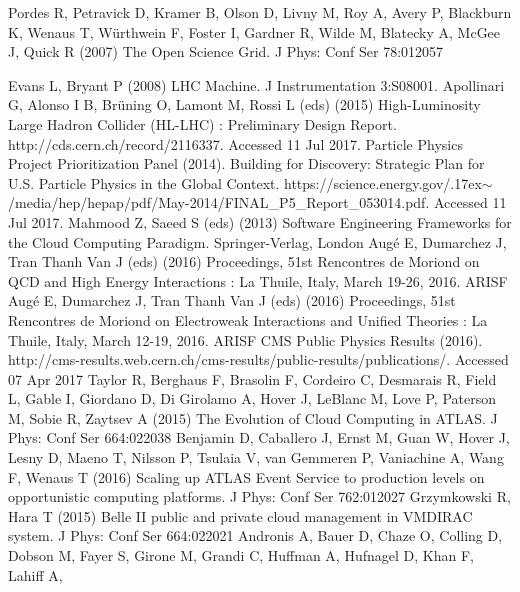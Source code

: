 \documentclass[twocolumn]{svjour3}          %
\begin{document}
\begin{thebibliography}{15}
 Pordes R, Petravick D, Kramer B, Olson D, Livny M, Roy A, Avery P, Blackburn K, Wenaus T,
W\"urthwein F, Foster I, Gardner R, Wilde M, Blatecky A, McGee J, Quick R (2007) The Open Science Grid. J Phys: Conf Ser 78:012057

 Evans L, Bryant P (2008) LHC Machine. J Instrumentation 3:S08001.
 Apollinari G, Alonso I B, Br\"uning O, Lamont M, Rossi L (eds) (2015) High-Luminosity Large Hadron Collider (HL-LHC) : Preliminary Design Report. http://cds.cern.ch/record/2116337. Accessed 11 Jul 2017.
 Particle Physics Project Prioritization Panel (2014). Building for Discovery: Strategic Plan for U.S. Particle Physics in the Global Context. https://science.energy.gov/{\raise.17ex\hbox{$\scriptstyle\sim$}}/media/hep/hepap/pdf/May-2014/FINAL\_P5\_Report\_053014.pdf. Accessed 11 Jul 2017.
 Mahmood Z, Saeed S (eds) (2013) Software Engineering Frameworks for the Cloud Computing Paradigm. Springer-Verlag, London
 Aug\'e E, Dumarchez J, Tran Thanh Van J (eds) (2016) Proceedings, 51st Rencontres de Moriond on QCD and High Energy Interactions : La Thuile, Italy, March 19-26, 2016. ARISF %
 Aug\'e E, Dumarchez J, Tran Thanh Van J (eds) (2016) Proceedings, 51st Rencontres de Moriond on Electroweak Interactions and Unified Theories : La Thuile, Italy, March 12-19, 2016. ARISF  %
 CMS Public Physics Results (2016). http://cms-results.web.cern.ch/cms-results/public-results/publications/. Accessed 07 Apr 2017
 Taylor R, Berghaus F, Brasolin F, Cordeiro C, Desmarais R, Field L, Gable I,  Giordano D, Di Girolamo A, Hover J, LeBlanc M, Love P, Paterson M, Sobie R, Zaytsev A (2015) The Evolution of Cloud Computing in ATLAS.  J Phys: Conf Ser 664:022038
 Benjamin D, Caballero J, Ernst M, Guan W, Hover J, Lesny D, Maeno T, Nilsson P, Tsulaia V, van Gemmeren P, Vaniachine A, Wang F, Wenaus T (2016) Scaling up ATLAS Event Service to production levels on opportunistic computing platforms.  J Phys: Conf Ser 762:012027
 Grzymkowski R, Hara T (2015) Belle II public and private cloud management in VMDIRAC system.  J Phys: Conf Ser 664:022021
 Andronis A, Bauer D, Chaze O, Colling D, Dobson M, Fayer S,
Girone M, Grandi C, Huffman A, Hufnagel D, Khan F, Lahiff A,

\end{thebibliography}
\end{document}
